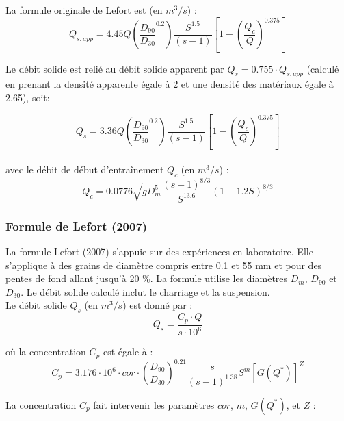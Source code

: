 \documentclass[a4paper,10pt]{article}
\begin{document}
\noindent
La formule originale de Lefort est (en $m^3/s$) :
$$ Q_{s, app} = 4.45 Q \left(\frac{D_{90}}{D_{30}}^{0.2}\right) \frac{S^{1.5}}{(s-1)} \left[1 - \left(\frac{Q_c}{Q}\right)^{0.375}\right] $$

\noindent
Le d\'ebit solide est reli\'e au d\'ebit solide apparent par $ Q_s =  0.755 \cdot Q_{s, app}$ (calcul\'e en prenant la densit\'e apparente \'egale \`a 2 et une densit\'e des mat\'eriaux \'egale \`a 2.65), soit:

$$ Q_s = 3.36 Q \left(\frac{D_{90}}{D_{30}}^{0.2}\right) \frac{S^{1.5}}{(s-1)} \left[1 - \left(\frac{Q_c}{Q}\right)^{0.375}\right] $$ \\

\noindent
avec le d\'ebit de d\'ebut d'entra\^inement $Q_c$ (en $m^3/s$) :
$$ Q_c = 0.0776 \sqrt{g D_m^5} \frac{(s-1)^{8/3}}{S^{13.6}} (1-1.2 S)^{8/3} $$


\subsubsection{Formule de Lefort (2007)}

\noindent
La formule Lefort (2007) s'appuie sur des exp\'eriences en laboratoire. Elle s'applique \`a des grains de diam\`etre compris entre 0.1 et 55 mm et pour des pentes de fond allant jusqu'\`a 20 \%. La formule utilise les diam\`etres $D_m$, $D_{90}$ et $D_{30}$. Le d\'ebit solide calcul\'e inclut le charriage et la suspension.\\ 

\noindent
Le d\'ebit solide $Q_s$ (en $m^3/s$) est donn\'e par :
$$Q_s = \frac{C_p \cdot Q}{s \cdot 10^6} $$

\noindent
o\`u la concentration $C_p$ \cite{lef1} est \'egale \`a : 
$$C_p = 3.176 \cdot 10^6 \cdot cor \cdot \left(\frac{D_{90}}{D_{30}}\right)^{0.21} \frac{s}{(s-1)^{1.38}} S^m [G(Q^*)]^Z$$

\noindent
La concentration $C_p$ fait intervenir les param\`etres $cor$, $m$, $G(Q^*)$, et $Z$ : \\
\end{document}
